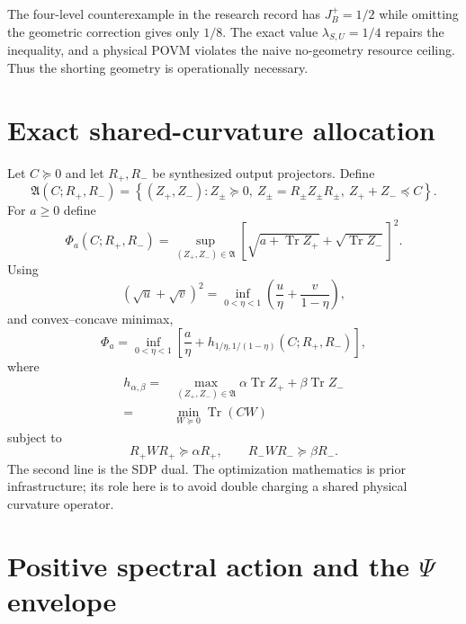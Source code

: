 \documentclass[aps,pra,preprint,nofootinbib]{revtex4-2}
\newcommand{\Tr}{\operatorname{Tr}}
\begin{document}
The four-level counterexample in the research record has $J_B^+=1/2$ while omitting the geometric correction gives only $1/8$. The exact value $\lambda_{S,U}=1/4$ repairs the inequality, and a physical POVM violates the naive no-geometry resource ceiling. Thus the shorting geometry is operationally necessary.

\section{Exact shared-curvature allocation}
\label{supp:allocation}

Let $C\succeq0$ and let $R_+,R_-$ be synthesized output projectors. Define
\begin{equation}
\mathfrak A(C;R_+,R_-)=
\left\{(Z_+,Z_-):
Z_\pm\succeq0,
\ Z_\pm=R_\pm Z_\pm R_\pm,
\ Z_++Z_-\preceq C
\right\}.
\end{equation}
For $a\ge0$ define
\begin{equation}
\Phi_a(C;R_+,R_-)
=\sup_{(Z_+,Z_-)\in\mathfrak A}
\left[\sqrt{a+\Tr Z_+}+\sqrt{\Tr Z_-}\right]^2.
\end{equation}
Using
\begin{equation}
(\sqrt u+\sqrt v)^2
=\inf_{0<\eta<1}\left(\frac u\eta+\frac v{1-\eta}\right),
\end{equation}
and convex--concave minimax,
\begin{equation}
\Phi_a
=\inf_{0<\eta<1}
\left[
\frac a\eta+h_{1/\eta,1/(1-\eta)}(C;R_+,R_-)
\right],
\end{equation}
where
\begin{align}
h_{\alpha,\beta}
={}&\max_{(Z_+,Z_-)\in\mathfrak A}
\alpha\Tr Z_+ +\beta\Tr Z_-\\
={}&\min_{W\succeq0}\Tr(CW)
\end{align}
subject to
\begin{equation}
R_+WR_+\succeq\alpha R_+,
\qquad
R_-WR_-\succeq\beta R_-.
\end{equation}
The second line is the SDP dual. The optimization mathematics is prior infrastructure; its role here is to avoid double charging a shared physical curvature operator.

\section{Positive spectral action and the \texorpdfstring{$\Psi$}{Psi} envelope}
\label{supp:action}
\end{document}
